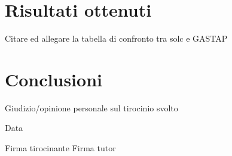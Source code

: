 \documentclass[a4paper,10pt]{article}
\begin{document}
\section{Risultati ottenuti}

Citare ed allegare la tabella di confronto tra solc e GASTAP

\section{Conclusioni}

Giudizio/opinione personale sul tirocinio svolto

\vspace{30mm}

\par
\noindent
\begin{minipage}[t]{0.47\textwidth}
{\large{Data}}
\end{minipage}
\hfill
\begin{minipage}[t]{0.47\textwidth}\raggedleft
{\large{Firma tirocinante\newline
\newline
\newline
Firma tutor\newline}}
\end{minipage}
\end{document}
